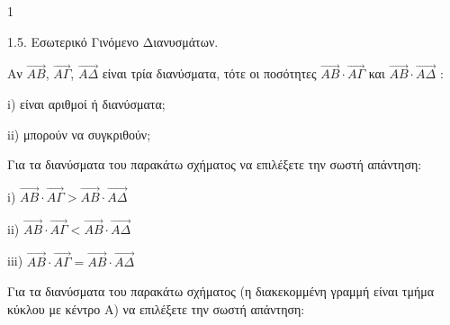 \begin{ylh}{1}
    \item 1.5. Εσωτερικό Γινόμενο Διανυσμάτων.
\end{ylh}
\begin{alist}
    \item[α)] Αν $\vec{AB}$, $\vec{AΓ}$, $\vec{AΔ}$ είναι τρία διανύσματα, τότε οι ποσότητες $\vec{AB} \cdot \vec{AΓ}$ και $\vec{AB} \cdot \vec{AΔ}$ :
    \begin{rlist}
        \item i) είναι αριθμοί ή διανύσματα;
        \item ii) μπορούν να συγκριθούν;
    \end{rlist} 

    \item[β)] Για τα διανύσματα του παρακάτω σχήματος να επιλέξετε την σωστή απάντηση:
    \begin{figure}
    \centering
    \end{figure}
    \begin{rlist}
        \item i) $\vec{AB} \cdot \vec{AΓ} > \vec{AB} \cdot \vec{AΔ}$
        \item ii) $\vec{AB} \cdot \vec{AΓ} < \vec{AB} \cdot \vec{AΔ}$
        \item iii) $\vec{AB} \cdot \vec{AΓ} = \vec{AB} \cdot \vec{AΔ}$
    \end{rlist} 

    \item[γ)] Για τα διανύσματα του παρακάτω σχήματος (η διακεκομμένη γραμμή είναι τμήμα κύκλου με κέντρο A) να επιλέξετε την σωστή απάντηση:
    \begin{figure}
    \centering
\end{figure}
\end{alist}
